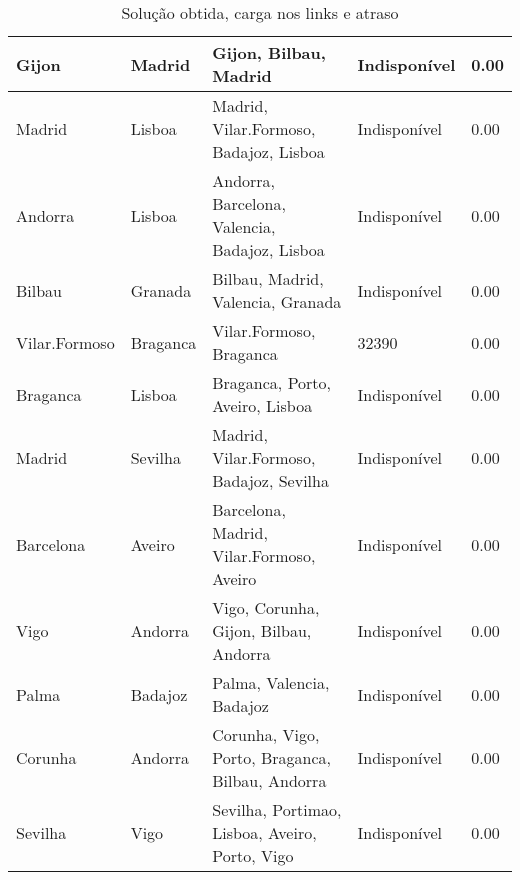 \begin{table}[!htb]
{\begin{tabular}{|l|l|l|l|l|}
Gijon & Madrid & Gijon, Bilbau, Madrid & Indisponível & 0.00 \\ \hline
Madrid & Lisboa & Madrid, Vilar.Formoso, Badajoz, Lisboa & Indisponível & 0.00 \\ \hline
Andorra & Lisboa & Andorra, Barcelona, Valencia, Badajoz, Lisboa & Indisponível & 0.00 \\ \hline
Bilbau & Granada & Bilbau, Madrid, Valencia, Granada & Indisponível & 0.00 \\ \hline
Vilar.Formoso & Braganca & Vilar.Formoso, Braganca & 32390 & 0.00 \\ \hline
Braganca & Lisboa & Braganca, Porto, Aveiro, Lisboa & Indisponível & 0.00 \\ \hline
Madrid & Sevilha & Madrid, Vilar.Formoso, Badajoz, Sevilha & Indisponível & 0.00 \\ \hline
Barcelona & Aveiro & Barcelona, Madrid, Vilar.Formoso, Aveiro & Indisponível & 0.00 \\ \hline
Vigo & Andorra & Vigo, Corunha, Gijon, Bilbau, Andorra & Indisponível & 0.00 \\ \hline
Palma & Badajoz & Palma, Valencia, Badajoz & Indisponível & 0.00 \\ \hline
Corunha & Andorra & Corunha, Vigo, Porto, Braganca, Bilbau, Andorra & Indisponível & 0.00 \\ \hline
Sevilha & Vigo & Sevilha, Portimao, Lisboa, Aveiro, Porto, Vigo & Indisponível & 0.00 \\ \hline
\end{tabular}}
\caption[]{Solução obtida, carga nos links e atraso}
\end{table}

